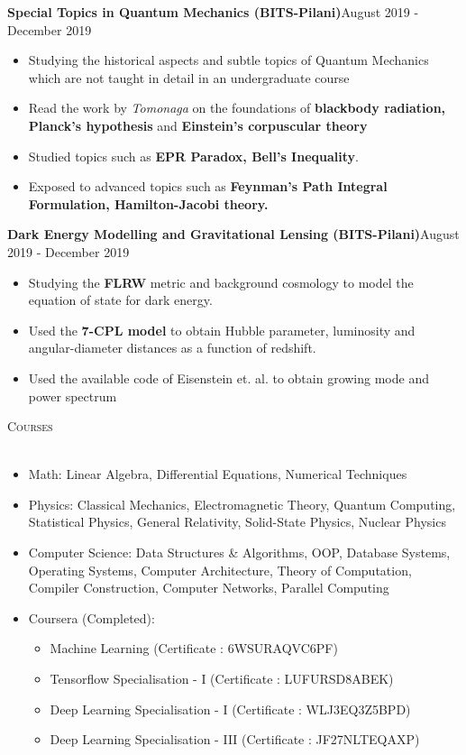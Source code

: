 \documentclass[a4paper]{article}
\newcommand{\lineunder} {
    \vspace*{-8pt} \\
    \hspace*{-18pt} \hrulefill \\
}
\newcommand{\header} [1] {
    {\hspace*{-18pt}\vspace*{6pt} \textsc{#1}}
    \vspace*{-6pt} \lineunder
}
\begin{document}
{\textbf{Special Topics in Quantum Mechanics (BITS-Pilani)}}\hfill August 2019 - December 2019\\
\begin{itemize} \itemsep 1pt
    \item Studying the historical aspects and subtle topics of Quantum Mechanics which are not taught in detail in an undergraduate course
    \item Read the work by \textit{Tomonaga} on the foundations of \textbf{blackbody radiation, Planck's hypothesis} and \textbf{Einstein's corpuscular theory}
    \item Studied topics such as \textbf{EPR Paradox, Bell's Inequality}.
    \item Exposed to advanced topics such as \textbf{Feynman's Path Integral Formulation, Hamilton-Jacobi theory.}
\end{itemize}
\vspace*{2mm}


{\textbf{Dark Energy Modelling and Gravitational Lensing (BITS-Pilani)}}\hfill August 2019 - December 2019\\
\begin{itemize} \itemsep 1pt
    \item Studying the \textbf{FLRW} metric and background cosmology to model the equation of state for dark energy.
    \item  Used the \textbf{7-CPL model} to obtain Hubble parameter, luminosity and angular-diameter distances as a function of redshift.
    \item Used the available code of Eisenstein et. al. to obtain growing mode and power spectrum
\end{itemize}
\vspace*{2mm}

\header{Courses}
\begin{itemize} \itemsep 1pt
	\item Math: Linear Algebra, Differential Equations, Numerical Techniques    
	\item Physics: Classical Mechanics, Electromagnetic Theory, Quantum Computing, Statistical Physics, General Relativity, Solid-State Physics, Nuclear Physics
	\item Computer Science: Data Structures \& Algorithms, OOP, Database Systems, Operating Systems, Computer Architecture, Theory of Computation, Compiler Construction, Computer Networks, Parallel Computing
	\item Coursera (Completed): 
	\begin{itemize}
	    \item Machine Learning (Certificate : 6WSURAQVC6PF)
	    \item Tensorflow Specialisation - I (Certificate : LUFURSD8ABEK)
	    \item Deep Learning Specialisation - I (Certificate : WLJ3EQ3Z5BPD)
	    \item Deep Learning Specialisation - III (Certificate : JF27NLTEQAXP)
	\end{itemize}
\end{itemize}
\vspace{2mm}
\end{document}
